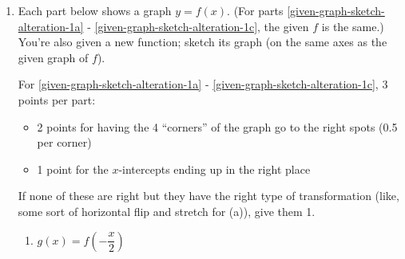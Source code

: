 \documentclass{article}
\begin{document}
\begin{enumerate}
\begin{enumerate}
\begin{solution}
      \textbf{Algebraically:} 
      \begin{itemize} 
      \item $j(2 ) = 5f(- 4) =0$
      \item $j (-1) =5f(2)=0$
      \item $j (-4 ) = 5f(8) =0$
      \end{itemize}      
    \end{solution} 
  \end{enumerate}

\item \label{given-graph-sketch-alteration-1} 

  Each part below shows a graph $y = f(x)$. (For parts \ref{given-graph-sketch-alteration-1a} - \ref{given-graph-sketch-alteration-1c}, the given $f$ is the same.) You're also given a new function; sketch its graph (on the same axes as the given graph of $f$).

  \begin{grading}
    For \ref{given-graph-sketch-alteration-1a} - \ref{given-graph-sketch-alteration-1c}, 3 points per part:
    \begin{itemize}[nosep]
    \item 2 points for having the 4 ``corners'' of the graph go to the right spots (0.5 per corner)
    \item 1 point for the $x$-intercepts ending up in the right place
    \end{itemize}
    If none of these are right but they have the right type of transformation (like, some sort of horizontal flip and stretch for (a)), give them 1.
  \end{grading}

  \begin{enumerate}

  \item \label{given-graph-sketch-alteration-1a}

    \begin{problem}
      $g(x) = f \left( - \dfrac{x}{2} \right)$
    \end{problem}



\end{enumerate}
\end{enumerate}
\end{document}

